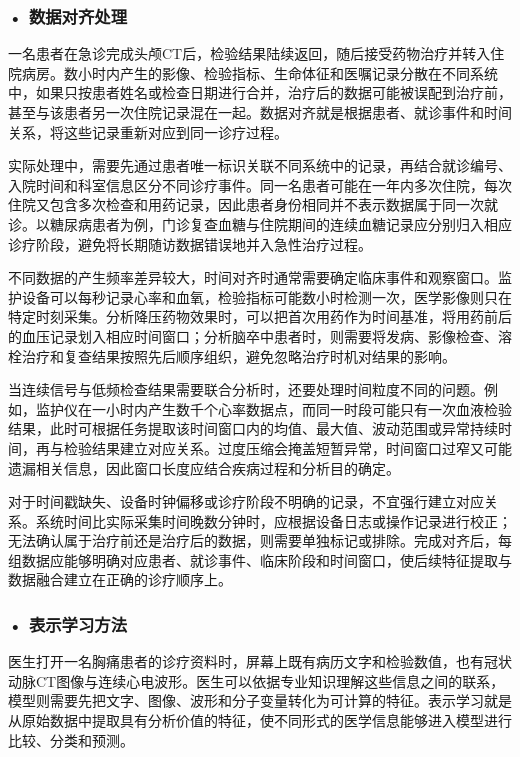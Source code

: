 \subsubsection*{\textbf{• 数据对齐处理}}

一名患者在急诊完成头颅CT后，检验结果陆续返回，随后接受药物治疗并转入住院病房。数小时内产生的影像、检验指标、生命体征和医嘱记录分散在不同系统中，如果只按患者姓名或检查日期进行合并，治疗后的数据可能被误配到治疗前，甚至与该患者另一次住院记录混在一起。数据对齐就是根据患者、就诊事件和时间关系，将这些记录重新对应到同一诊疗过程。

实际处理中，需要先通过患者唯一标识关联不同系统中的记录，再结合就诊编号、入院时间和科室信息区分不同诊疗事件。同一名患者可能在一年内多次住院，每次住院又包含多次检查和用药记录，因此患者身份相同并不表示数据属于同一次就诊。以糖尿病患者为例，门诊复查血糖与住院期间的连续血糖记录应分别归入相应诊疗阶段，避免将长期随访数据错误地并入急性治疗过程。

不同数据的产生频率差异较大，时间对齐时通常需要确定临床事件和观察窗口。监护设备可以每秒记录心率和血氧，检验指标可能数小时检测一次，医学影像则只在特定时刻采集。分析降压药物效果时，可以把首次用药作为时间基准，将用药前后的血压记录划入相应时间窗口；分析脑卒中患者时，则需要将发病、影像检查、溶栓治疗和复查结果按照先后顺序组织，避免忽略治疗时机对结果的影响。

当连续信号与低频检查结果需要联合分析时，还要处理时间粒度不同的问题。例如，监护仪在一小时内产生数千个心率数据点，而同一时段可能只有一次血液检验结果，此时可根据任务提取该时间窗口内的均值、最大值、波动范围或异常持续时间，再与检验结果建立对应关系。过度压缩会掩盖短暂异常，时间窗口过窄又可能遗漏相关信息，因此窗口长度应结合疾病过程和分析目的确定。

对于时间戳缺失、设备时钟偏移或诊疗阶段不明确的记录，不宜强行建立对应关系。系统时间比实际采集时间晚数分钟时，应根据设备日志或操作记录进行校正；无法确认属于治疗前还是治疗后的数据，则需要单独标记或排除。完成对齐后，每组数据应能够明确对应患者、就诊事件、临床阶段和时间窗口，使后续特征提取与数据融合建立在正确的诊疗顺序上。


\subsubsection*{\textbf{• 表示学习方法}}

医生打开一名胸痛患者的诊疗资料时，屏幕上既有病历文字和检验数值，也有冠状动脉CT图像与连续心电波形。医生可以依据专业知识理解这些信息之间的联系，模型则需要先把文字、图像、波形和分子变量转化为可计算的特征。表示学习就是从原始数据中提取具有分析价值的特征，使不同形式的医学信息能够进入模型进行比较、分类和预测。

